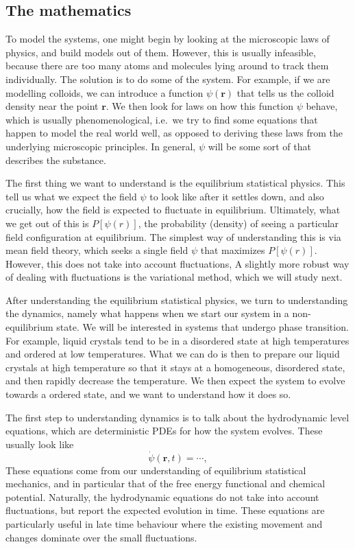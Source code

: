 \documentclass[a4paper]{article}
\begin{document}
\subsection{The mathematics}
To model the systems, one might begin by looking at the microscopic laws of physics, and build models out of them. However, this is usually infeasible, because there are too many atoms and molecules lying around to track them individually. The solution is to do some  of the system. For example, if we are modelling colloids, we can introduce a function $\psi(\mathbf{r})$ that tells us the colloid density near the point $\mathbf{r}$. We then look for laws on how this function $\psi$ behave, which is usually phenomenological, i.e.\ we try to find some equations that happen to model the real world well, as opposed to deriving these laws from the underlying microscopic principles. In general, $\psi$ will be some sort of  that describes the substance.

The first thing we want to understand is the equilibrium statistical physics. This tell us what we expect the field $\psi$ to look like after it settles down, and also crucially, how the field is expected to fluctuate in equilibrium. Ultimately, what we get out of this is $P[\psi(r)]$, the probability (density) of seeing a particular field configuration at equilibrium. The simplest way of understanding this is via mean field theory, which seeks a single field $\psi$ that maximizes $P[\psi(r)]$. However, this does not take into account fluctuations, A slightly more robust way of dealing with fluctuations is the variational method, which we will study next.

After understanding the equilibrium statistical physics, we turn to understanding the dynamics, namely what happens when we start our system in a non-equilibrium state. We will be interested in systems that undergo phase transition. For example, liquid crystals tend to be in a disordered state at high temperatures and ordered at low temperatures. What we can do is then to prepare our liquid crystals at high temperature so that it stays at a homogeneous, disordered state, and then rapidly decrease the temperature. We then expect the system to evolve towards a ordered state, and we want to understand how it does so.

The first step to understanding dynamics is to talk about the hydrodynamic level equations, which are deterministic PDEs for how the system evolves. These usually look like
\[
  \dot{\psi}(\mathbf{r}, t) = \cdots,
\]
These equations come from our understanding of equilibrium statistical mechanics, and in particular that of the free energy functional and chemical potential. Naturally, the hydrodynamic equations do not take into account fluctuations, but report the expected evolution in time. These equations are particularly useful in late time behaviour where the existing movement and changes dominate over the small fluctuations.
\end{document}

